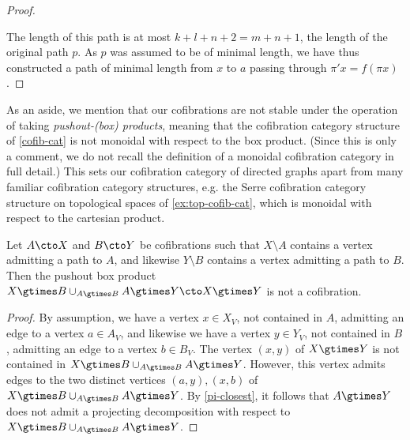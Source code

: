 \begin{proof}
\begin{figure}[H]
\end{figure}


The length of this path is at most $k + l + n + 2 = m + n + 1$, the length of the original path $p$. As $p$ was assumed to be of minimal length, we have thus constructed a path of minimal length from $x$ to $a$ passing through $\pi' x = f(\pi x)$.
\end{proof}

As an aside, we mention that our cofibrations are not stable under the operation of taking \emph{pushout-(box) products}, meaning that the cofibration category structure of \cref{cofib-cat} is not monoidal with respect to the box product.
(Since this is only a comment, we do not recall the definition of a monoidal cofibration category in full detail.)
This sets our cofibration category of directed graphs apart from many familiar cofibration category structures, e.g. the Serre cofibration category structure on topological spaces of \cref{ex:top-cofib-cat}, which is monoidal with respect to the cartesian product.

\begin{proposition}
Let $A \cto X$ and $B \cto Y$ be cofibrations such that $X \setminus A$ contains a vertex admitting a path to $A$, and likewise $Y \setminus B$ contains a vertex admitting a path to $B$.
Then the pushout box product $X \gtimes B \cup_{A \gtimes B} A \gtimes Y \cto X \gtimes Y$ is not a cofibration.
\end{proposition}

\begin{proof}
By assumption, we have a vertex $x \in X_V$, not contained in $A$, admitting an edge to a vertex $a \in A_V$, and likewise we have a vertex $y \in Y_V$, not contained in $B$, admitting an edge to a vertex $b \in B_V$. The vertex $(x,y)$ of $X \gtimes Y$ is not contained in $X \gtimes B \cup_{A \gtimes B} A \gtimes Y$. However, this vertex admits edges to the two distinct vertices $(a,y), (x,b)$ of $X \gtimes B \cup_{A \gtimes B} A \gtimes Y$. By \cref{pi-closest}, it follows that $A \gtimes Y$ does not admit a projecting decomposition with respect to $X \gtimes B \cup_{A \gtimes B} A \gtimes Y$.
\end{proof}

